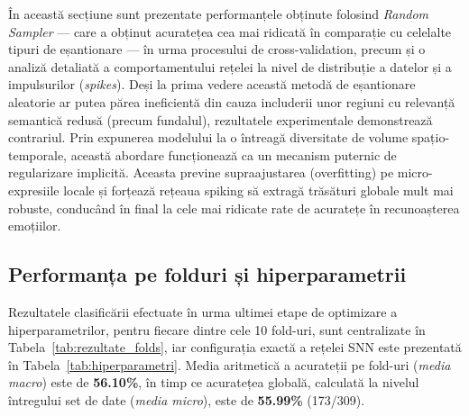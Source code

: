 În această secțiune sunt prezentate performanțele obținute folosind \textit{Random Sampler} --- care a obținut acuratețea cea mai ridicată în comparație cu celelalte tipuri de eșantionare --- în urma procesului de cross-validation, precum și o analiză detaliată a comportamentului rețelei la nivel de distribuție a datelor și a impulsurilor (\textit{spikes}). Deși la prima vedere această metodă de eșantionare aleatorie ar putea părea ineficientă din cauza includerii unor regiuni cu relevanță semantică redusă (precum fundalul), rezultatele experimentale demonstrează contrariul. Prin expunerea modelului la o întreagă diversitate de volume spațio-temporale, această abordare funcționează ca un mecanism puternic de regularizare implicită. Aceasta previne supraajustarea (overfitting) pe micro-expresiile locale și forțează rețeaua spiking să extragă trăsături globale mult mai robuste, conducând în final la cele mai ridicate rate de acuratețe în recunoașterea emoțiilor.

\subsection*{Performanța pe folduri și hiperparametrii}

Rezultatele clasificării efectuate în urma ultimei etape de optimizare a hiperparametrilor, pentru fiecare dintre cele 10 fold-uri, sunt centralizate în Tabela~\ref{tab:rezultate_folds}, iar configurația exactă a rețelei SNN este prezentată în Tabela~\ref{tab:hiperparametri}. Media aritmetică a acurateții pe fold-uri (\textit{media macro}) este de \textbf{56.10\%}, în timp ce acuratețea globală, calculată la nivelul întregului set de date (\textit{media micro}), este de \textbf{55.99\%} (173/309).

